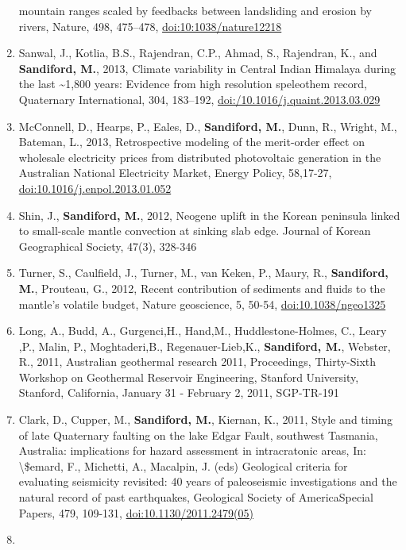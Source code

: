 \documentclass[
]{article}
\begin{document}
\begin{enumerate}
  mountain ranges scaled by feedbacks between landsliding and erosion by
  rivers, Nature, 498, 475--478, \url{doi:10:1038/nature12218}
\item
  Sanwal, J., Kotlia, B.S., Rajendran, C.P., Ahmad, S., Rajendran, K.,
  and \textbf{Sandiford, M.}, 2013, Climate variability in Central
  Indian Himalaya during the last \textasciitilde1,800 years: Evidence
  from high resolution speleothem record, Quaternary International, 304,
  183--192, \url{doi:/10.1016/j.quaint.2013.03.029}
\item
  McConnell, D., Hearps, P., Eales, D., \textbf{Sandiford, M.}, Dunn,
  R., Wright, M., Bateman, L., 2013, Retrospective modeling of the
  merit-order effect on wholesale electricity prices from distributed
  photovoltaic generation in the Australian National Electricity Market,
  Energy Policy, 58,17-27, \url{doi:10.1016/j.enpol.2013.01.052}
\item
  Shin, J., \textbf{Sandiford, M.}, 2012, Neogene uplift in the Korean
  peninsula linked to small-scale mantle convection at sinking slab
  edge. Journal of Korean Geographical Society, 47(3), 328-346
\item
  Turner, S., Caulfield, J., Turner, M., van Keken, P., Maury, R.,
  \textbf{Sandiford, M.}, Prouteau, G., 2012, Recent contribution of
  sediments and fluids to the mantle's volatile budget, Nature
  geoscience, 5, 50-54, \url{doi:10.1038/ngeo1325}
\item
  Long, A., Budd, A., Gurgenci,H., Hand,M., Huddlestone-Holmes, C.,
  Leary ,P., Malin, P., Moghtaderi,B., Regenauer-Lieb,K.,
  \textbf{Sandiford, M.}, Webster, R., 2011, Australian geothermal
  research 2011, Proceedings, Thirty-Sixth Workshop on Geothermal
  Reservoir Engineering, Stanford University, Stanford, California,
  January 31 - February 2, 2011, SGP-TR-191
\item
  Clark, D., Cupper, M., \textbf{Sandiford, M.}, Kiernan, K., 2011,
  Style and timing of late Quaternary faulting on the lake Edgar Fault,
  southwest Tasmania, Australia: implications for hazard assessment in
  intracratonic areas, In: \textbackslash\$emard, F., Michetti, A.,
  Macalpin, J. (eds) Geological criteria for evaluating seismicity
  revisited: 40 years of paleoseismic investigations and the natural
  record of past earthquakes, Geological Society of AmericaSpecial
  Papers, 479, 109-131, \url{doi:10.1130/2011.2479(05)}
\item

\end{enumerate}
\end{document}
